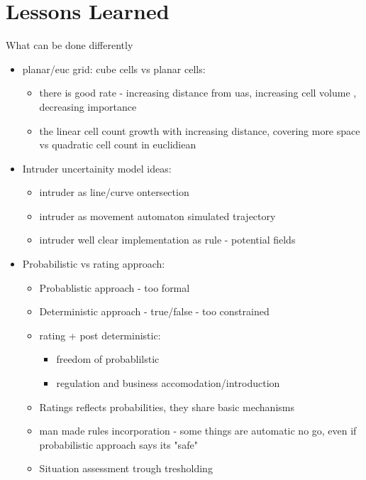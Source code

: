 \section{Lessons Learned}\label{s:lessonsLearned}
What can be done differently
\begin{itemize}
	\item planar/euc grid: cube cells vs planar cells:
	\begin{itemize}
	    \item there is good rate - increasing distance from uas, increasing cell volume , decreasing importance
	    \item the linear cell count growth with increasing distance, covering more space vs quadratic cell count in euclidiean
	\end{itemize}
	
	\item Intruder uncertainity model ideas:
	\begin{itemize}
	    \item intruder as line/curve ontersection
	    \item intruder as movement automaton simulated trajectory
	    \item intruder well clear implementation as rule - potential fields
	\end{itemize}
	
	\item Probabilistic vs rating approach:
	\begin{itemize}
	    \item Probablistic approach - too formal
	    \item Deterministic approach - true/false - too constrained
	    \item rating +  post deterministic: 
	    \begin{itemize}
	        \item freedom of probablilstic
	        \item regulation and business accomodation/introduction
	    \end{itemize}
	    \item Ratings reflects probabilities, they share basic mechanisms
	    \item man made rules incorporation - some things are automatic no go, even if probabilistic approach says its "safe"
	    \item Situation assessment trough tresholding
	\end{itemize}
\end{itemize}

